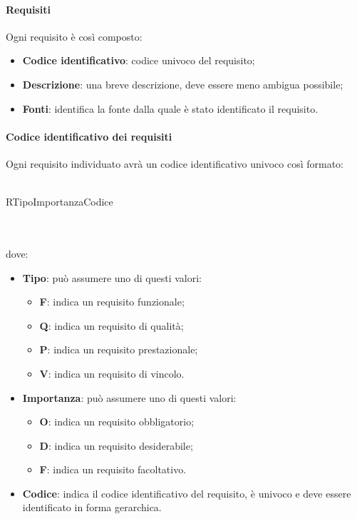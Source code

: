  \paragraph{Requisiti}
 Ogni requisito è così composto:
  \begin{itemize}
  \item \textbf{Codice identificativo}: codice univoco del requisito;
  \item \textbf{Descrizione}: una breve descrizione, deve essere meno ambigua possibile;
  \item \textbf{Fonti}: identifica la fonte dalla quale è stato identificato il requisito.
 \end{itemize}
 \paragraph{Codice identificativo dei requisiti}
 Ogni requisito individuato avrà un codice identificativo univoco così formato: \\ \\
 \centerline{R\textbraceleft{}Tipo\textbraceright{}\textbraceleft{}Importanza\textbraceright{}\textbraceleft{}Codice\textbraceright{}}
 \\ \\
 dove:
 \begin{itemize}
 	\item \textbf{Tipo}: può assumere uno di questi valori:
 	\begin{itemize}
 		\item \textbf{F}: indica un requisito funzionale;
 		\item \textbf{Q}: indica un requisito di qualità;
 		\item \textbf{P}: indica un requisito prestazionale;
 		\item \textbf{V}: indica un requisito di vincolo.
 	\end{itemize}
 	\item \textbf{Importanza}: può assumere uno di questi valori:
 	\begin{itemize}
 		\item \textbf{O}: indica un requisito obbligatorio;
 		\item \textbf{D}: indica un requisito desiderabile;
 		\item \textbf{F}: indica un requisito facoltativo.
 	\end{itemize}
 	\item \textbf{Codice}: indica il codice identificativo del requisito, è univoco e deve essere identificato in forma gerarchica.
 \end{itemize}
